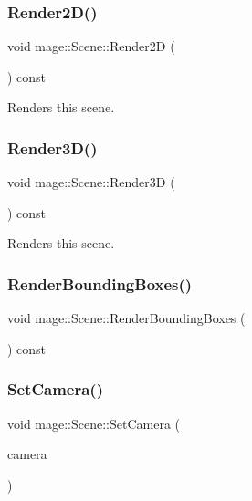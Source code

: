 \hypertarget{classmage_1_1_scene_a53487349d68f0ffcc91b243d0cfb86a3}{}\label{classmage_1_1_scene_a53487349d68f0ffcc91b243d0cfb86a3} 
\subsubsection{\texorpdfstring{Render2\+D()}{Render2D()}}
{\footnotesize\ttfamily void mage\+::\+Scene\+::\+Render2D (\begin{DoxyParamCaption}{ }\end{DoxyParamCaption}) const}

Renders this scene. \hypertarget{classmage_1_1_scene_a51d2d441067d30cf3a444d6a80811f93}{}\label{classmage_1_1_scene_a51d2d441067d30cf3a444d6a80811f93} 
\subsubsection{\texorpdfstring{Render3\+D()}{Render3D()}}
{\footnotesize\ttfamily void mage\+::\+Scene\+::\+Render3D (\begin{DoxyParamCaption}{ }\end{DoxyParamCaption}) const}

Renders this scene. \hypertarget{classmage_1_1_scene_a522bdeaff61129f6df93345a3eef693f}{}\label{classmage_1_1_scene_a522bdeaff61129f6df93345a3eef693f} 
\subsubsection{\texorpdfstring{Render\+Bounding\+Boxes()}{RenderBoundingBoxes()}}
{\footnotesize\ttfamily void mage\+::\+Scene\+::\+Render\+Bounding\+Boxes (\begin{DoxyParamCaption}{ }\end{DoxyParamCaption}) const}

\hypertarget{classmage_1_1_scene_a7568ec0884d04812af2f70990c8ec80d}{}\label{classmage_1_1_scene_a7568ec0884d04812af2f70990c8ec80d} 
\subsubsection{\texorpdfstring{Set\+Camera()}{SetCamera()}}
{\footnotesize\ttfamily void mage\+::\+Scene\+::\+Set\+Camera (\begin{DoxyParamCaption}\item[{\hyperlink{namespacemage_a1e01ae66713838a7a67d30e44c67703e}{Shared\+Ptr}$<$ \hyperlink{classmage_1_1_camera_node}{Camera\+Node} $>$}]{camera }\end{DoxyParamCaption})}

